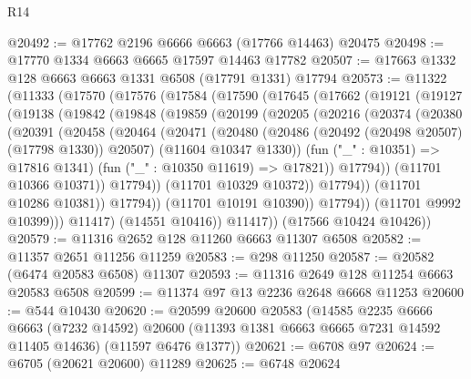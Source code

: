 \begin{lexlean}{R14}
\begin{coremodule}
@20492 := @17762 @2196 @6666 @6663 (@17766 @14463) @20475
@20498 := @17770 @1334 @6663 @6665 @17597 @14463 @17782
@20507 := @17663 @1332 @128 @6663 @6663 @1331 @6508 (@17791 @1331) @17794
@20573 := @11322
    (@11333
      (@17570
        (@17576
          (@17584
            (@17590
              (@17645
                (@17662
                  (@19121
                    (@19127
                      (@19138
                        (@19842
                          (@19848
                            (@19859
                              (@20199
                                (@20205
                                  (@20216
                                    (@20374
                                      (@20380
                                        (@20391
                                          (@20458
                                            (@20464
                                              (@20471
                                                (@20480
                                                  (@20486
                                                    (@20492 (@20498 @20507) (@17798 @1330))
                                                    @20507)
                                                  (@11604 @10347 @1330))
                                                (fun ("_" : @10351) => @17816 @1341)
                                                (fun ("_" : @10350 @11619) => @17821))
                                              @17794))
                                          (@11701 @10366 @10371))
                                        @17794))
                                    (@11701 @10329 @10372))
                                  @17794))
                              (@11701 @10286 @10381))
                            @17794))
                        (@11701 @10191 @10390))
                      @17794))
                  (@11701 @9992 @10399)))
              @11417)
            (@14551 @10416))
          @11417))
      (@17566 @10424 @10426))
@20579 := @11316 @2652 @128 @11260 @6663 @11307 @6508
@20582 := @11357 @2651 @11256 @11259
@20583 := @298 @11250
@20587 := @20582 (@6474 @20583 @6508) @11307
@20593 := @11316 @2649 @128 @11254 @6663 @20583 @6508
@20599 := @11374 @97 @13 @2236 @2648 @6668 @11253
@20600 := @544 @10430
@20620 := @20599
    @20600
    @20583
    (@14585
      @2235
      @6666
      @6663
      (@7232 @14592)
      @20600
      (@11393 @1381 @6663 @6665 @7231 @14592 @11405 @14636)
      (@11597 @6476 @1377))
@20621 := @6708 @97
@20624 := @6705 (@20621 @20600) @11289
@20625 := @6748 @20624

\end{coremodule}
\end{lexlean}
